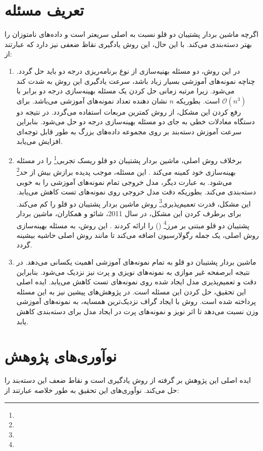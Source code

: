 \section{تعریف مسئله} 
اگرچه ماشین بردار پشتیبان دو قلو نسبت به  اصلی سریعتر است و داده‌های نامتوزان را بهتر دسته‌بندی می‌کند. با این حال، این روش یادگیری نقاظ ضعفی نیز دارد که عبارتند از:
\begin{enumerate}
	\item 	در این روش، دو مسئله بهنیه‌سازی از نوع برنامه‌ریزی درجه دو باید حل گردد. چناچه نمونه‌های آموزشی بسیار زیاد باشد، سرعت یادگیری این روش به شدت کند می‌شود. زیرا مرتبه زمانی حل کردن یک مسئله بهینه‌سازی درجه دو برابر با $\mathcal{O}(n^3)$ است. بطوریکه $n$ نشان دهنده تعداد نمونه‌های آموزشی می‌باشد. برای رفع کردن این مشکل، از روش کمترین مربعات  \cite{kumar2009} استفاده می‌گردد. در نتیجه دو دستگاه معادلات خطی به جای دو مسئله بهینه‌سازی درجه دو حل می‌شود. بنابراین سرعت آموزش دسته‌بند بر روی مجموعه داده‌های بزرگ به طور قابل توجه‌ای افزایش می‌یابد.
	\item برخلاف روش  اصلی، ماشین بردار پشتیبان دو قلو ریسک تجربی\footnote{} را در مسئله بهینه‌سازی خود کمینه می‌کند .\cite{shao2011} این مسئله، موجب پدیده برازش بیش از حد\footnote{} می‌شود. به عبارت دیگر، مدل خروجی تمام نمونه‌های آموزشی را به خوبی دسته‌بندی می‌کند. بطوریکه دقت مدل خروجی روی نمونه‌های تست کاهش می‌یابد. این مشکل، قدرت تعمیم‌پذیری\footnote{} روش ماشین بردار پشتیبان دو قلو را کم می‌کند. برای برطرف کردن این مشکل، در سال 2011، شائو و همکاران، ماشین بردار پشتیبان دو قلو مبتنی بر مرز\footnote{}  () را ارائه کردند \cite{shao2011}. این روش، به مسئله بهینه‌سازی روش  اصلی، یک جمله رگولارسیون اضافه می‌کند تا مانند روش  اصلی حاشیه بیشینه گردد.
	\item ماشین بردار پشتیبان دو قلو به تمام نمونه‌های آموزشی اهمیت یکسانی می‌دهد. در نتیجه ابرصفحه غیر موازی به نمونه‌های نویزی و پرت نیز نزدیک می‌شود. بنابراین دقت و تعمیم‌پذیری مدل ایجاد شده روی نمونه‌های تست کاهش می‌یابد. ایده اصلی این تحقیق، حل کردن این مسئله است. در پژوهش‌های پیشین نیز به این مسئله پرداخته شده است. روش  \cite{ye2012} با ایجاد گراف نزدیک‌ترین همسایه، به نمونه‌های آموزشی وزن نسبت می‌دهد تا اثر نویز و نمونه‌های پرت در ایجاد مدل برای دسته‌بندی کاهش یابد.
\end{enumerate}

\section{نوآوری‌های پژوهش}
ایده اصلی این پژوهش بر گرفته از روش یادگیری   \cite{ye2012} است و نقاط ضعف این دسته‌بند را حل می‌کند. نوآوری‌های این تحقیق به طور خلاصه عبارتند از:

